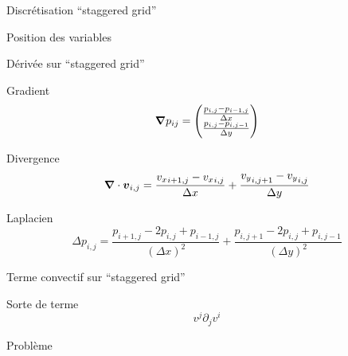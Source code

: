 \begin{frame}{Discrétisation ``staggered grid''}
\begin{block}{Position des variables}
\shorthandoff{;:} 
 \shorthandon{:;}
\end{block}

 
\end{frame}

\begin{frame}{Dérivée sur ``staggered grid''}
\begin{block}{Gradient}
 \begin{equation*}
  {\boldsymbol {\nabla}}p_{ij}=\begin{pmatrix}
    \frac{p_{i,j}-p_{i-1,j}}{\Delta x}\\
    \frac{p_{i,j}-p_{i,j-1}}{\Delta y}\\
                      \end{pmatrix}
 \end{equation*}
\end{block}

\begin{block}{Divergence}
 \begin{equation*}
{\boldsymbol {\nabla}}\cdot {\boldsymbol {v}}_{i,j}=\frac{{v_{x}}_{i+1,j}-{v_{x}}_{i,j}}{\Delta x}+\frac{{v_{y}}_{i,j+1}-{v_{y}}_{i,j}}{\Delta y}
 \end{equation*}
\end{block}
 
 \begin{block}{Laplacien}
 \begin{equation*}
    \Delta p_{i,j}=\frac{p_{i+1,j}-2p_{i,j}+p_{i-1,j}}{(\Delta x)^2}+\frac{p_{i,j+1}-2p_{i,j}+p_{i,j-1}}{(\Delta y)^2}
   \end{equation*}
 \end{block}

 
\end{frame}

\begin{frame}{Terme convectif sur ``staggered grid''}
\begin{block}{Sorte de terme}
 \begin{equation*}
v^{j}\partial_{j}v^{i}
\end{equation*}
\end{block}
\begin{block}{Problème}
\end{block}

\end{frame}

